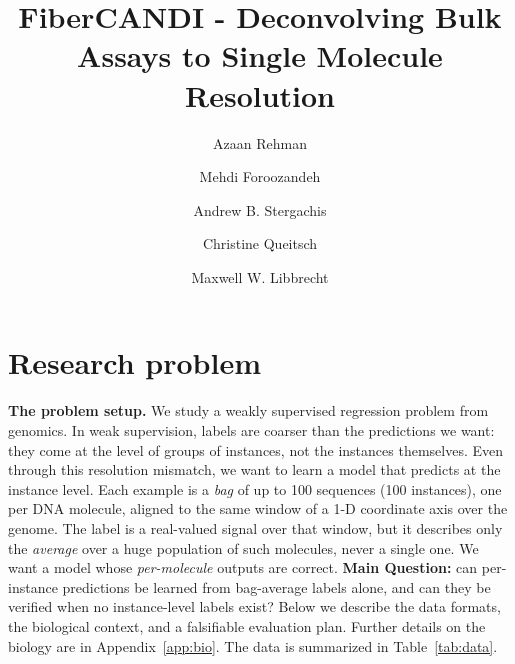 \documentclass[acmtog,nonacm]{acmart}   %
\begin{document}
\title{FiberCANDI - Deconvolving Bulk Assays to Single Molecule Resolution}

\author{Azaan Rehman}
\correspondingauthor
{}

\author{Mehdi Foroozandeh}

\author{Andrew B. Stergachis}

\author{Christine Queitsch}

\author{Maxwell W. Libbrecht}

\renewcommand{\shortauthors}{Rehman et al.}

\maketitle

\section{Research problem}

\textbf{The problem setup.} We study a weakly supervised regression problem from genomics.
  In weak supervision, labels are coarser than the predictions we want: they come at the
  level of groups of instances, not the instances themselves. Even through this resolution
  mismatch, we want to learn a model that predicts at the instance level. Each example is a
  \emph{bag} of up to 100 sequences (100 instances), one per DNA molecule, aligned to
  the same window of a 1-D coordinate axis over the genome. The label is a real-valued signal
  over that window, but it describes only the \emph{average} over a huge population of such
  molecules, never a single one. We want a model whose \emph{per-molecule} outputs are
  correct. \textbf{Main Question:} can per-instance predictions be learned from bag-average
  labels alone, and can they be verified when no instance-level labels exist? Below we
  describe the data formats, the biological context, and a falsifiable evaluation plan.
  Further details on the biology are in Appendix~\ref{app:bio}. The data is summarized in
  Table~\ref{tab:data}.
\end{document}
